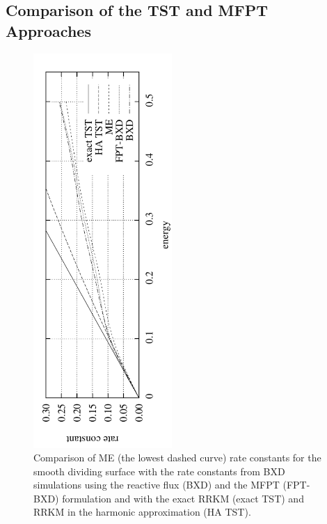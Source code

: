 \subsection{Comparison of the TST and MFPT Approaches}

\begin{figure}[h!]
\centering
\includegraphics[height=15cm, angle=270]{Images/smooth.pdf}
\caption[Comparison of TST, harmonic TST, ME, BXD and FPT-BXD rate constants.]{Comparison of ME (the lowest dashed curve) rate constants for the smooth dividing surface with the rate constants from BXD simulations using the reactive flux (BXD) and the MFPT (FPT-BXD) formulation and with the exact RRKM (exact TST) and RRKM in the harmonic approximation (HA TST).}
\label{fig:tst-bxd}
\end{figure}

